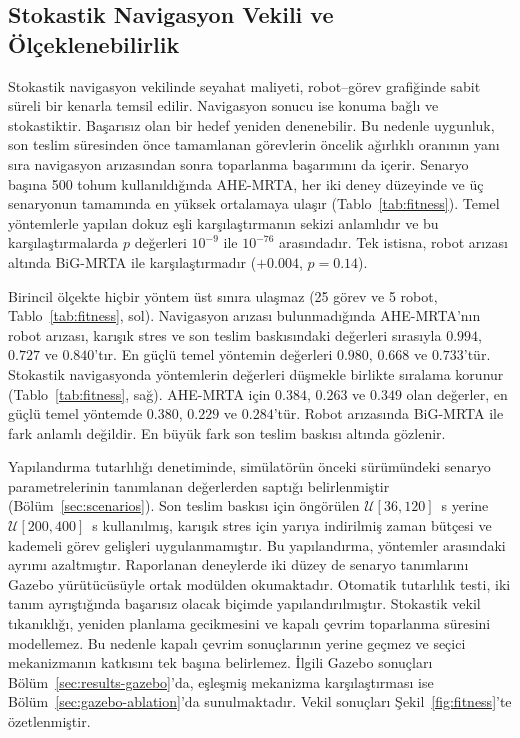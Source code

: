 \documentclass[10pt,letterpaper,onecolumn]{IEEEtran}
\begin{document}
\subsection{Stokastik Navigasyon Vekili ve Ölçeklenebilirlik}
\label{sec:scalability}

Stokastik navigasyon vekilinde seyahat maliyeti, robot--görev grafiğinde sabit
süreli bir kenarla temsil edilir. Navigasyon sonucu ise konuma bağlı ve
stokastiktir. Başarısız olan bir hedef yeniden denenebilir. Bu nedenle
uygunluk, son teslim süresinden önce tamamlanan görevlerin öncelik ağırlıklı
oranının yanı sıra navigasyon arızasından sonra toparlanma başarımını da
içerir. Senaryo başına 500 tohum kullanıldığında AHE-MRTA, her iki deney
düzeyinde ve üç senaryonun tamamında en yüksek ortalamaya ulaşır
(Tablo~\ref{tab:fitness}). Temel yöntemlerle yapılan dokuz eşli
karşılaştırmanın sekizi anlamlıdır ve bu karşılaştırmalarda $p$ değerleri
$10^{-9}$ ile $10^{-76}$ arasındadır. Tek istisna, robot arızası altında
BiG-MRTA ile karşılaştırmadır ($+0.004$, $p{=}0.14$).



Birincil ölçekte hiçbir yöntem üst sınıra ulaşmaz (25 görev ve 5 robot,
Tablo~\ref{tab:fitness}, sol). Navigasyon arızası bulunmadığında AHE-MRTA'nın
robot arızası, karışık stres ve son teslim baskısındaki değerleri sırasıyla
$0.994$, $0.727$ ve $0.840$'tır. En güçlü temel yöntemin değerleri $0.980$,
$0.668$ ve $0.733$'tür. Stokastik navigasyonda yöntemlerin değerleri düşmekle
birlikte sıralama korunur (Tablo~\ref{tab:fitness}, sağ). AHE-MRTA için
$0.384$, $0.263$ ve $0.349$ olan değerler, en güçlü temel yöntemde $0.380$,
$0.229$ ve $0.284$'tür. Robot arızasında BiG-MRTA ile fark anlamlı değildir.
En büyük fark son teslim baskısı altında gözlenir.

Yapılandırma tutarlılığı denetiminde, simülatörün önceki sürümündeki senaryo
parametrelerinin tanımlanan değerlerden saptığı belirlenmiştir
(Bölüm~\ref{sec:scenarios}). Son teslim baskısı için öngörülen
$\mathcal U[36,120]$~s yerine
$\mathcal U[200,400]$~s kullanılmış, karışık stres için yarıya indirilmiş zaman
bütçesi ve kademeli görev gelişleri uygulanmamıştır. Bu yapılandırma, yöntemler
arasındaki ayrımı azaltmıştır. Raporlanan deneylerde iki düzey de senaryo
tanımlarını Gazebo yürütücüsüyle ortak modülden okumaktadır. Otomatik tutarlılık
testi, iki tanım ayrıştığında başarısız olacak biçimde yapılandırılmıştır.
Stokastik vekil tıkanıklığı, yeniden planlama gecikmesini ve kapalı çevrim
toparlanma süresini modellemez. Bu nedenle kapalı çevrim sonuçlarının yerine
geçmez ve seçici mekanizmanın katkısını tek başına belirlemez. İlgili Gazebo
sonuçları Bölüm~\ref{sec:results-gazebo}'da, eşleşmiş mekanizma karşılaştırması
ise Bölüm~\ref{sec:gazebo-ablation}'da sunulmaktadır. Vekil sonuçları
Şekil~\ref{fig:fitness}'te özetlenmiştir.
\end{document}
